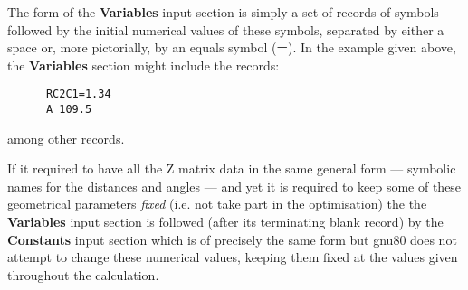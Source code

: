 The form of the {\bf Variables} input section is simply a set of
records of symbols followed by the initial numerical values of these
symbols, separated by either a space or, more pictorially, by an equals
symbol ({\bf =}). In the example given above, the {\bf Variables} section 
might include the records:
\begin{verbatim}
      RC2C1=1.34
      A 109.5
\end{verbatim}
among other records.

If it required to have all the Z matrix data in the same general form ---
symbolic names for the distances and angles --- and yet it is required
to keep some of these geometrical parameters {\em fixed} (i.e. not
take part in the optimisation) the the {\bf Variables} input section
is followed (after its terminating blank record) by the
{\bf Constants} input section which is of precisely the same form but
gnu80 does not attempt to change these numerical values, keeping them
fixed at the values given throughout the calculation.

